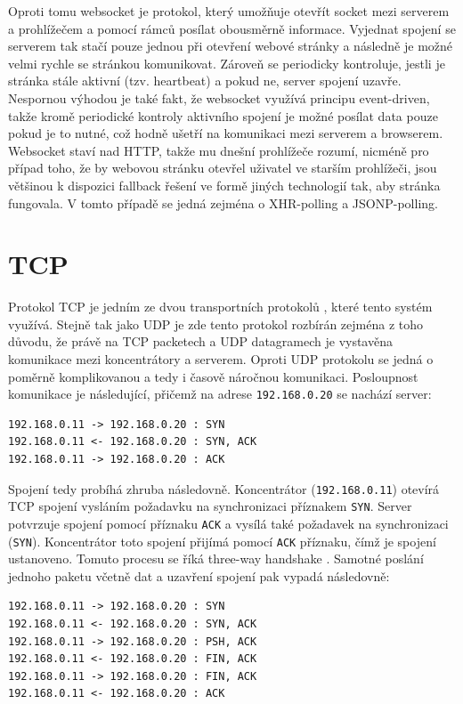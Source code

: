 Oproti tomu websocket \cite{rfc6455} je protokol, který umožňuje otevřít socket mezi serverem a prohlížečem a pomocí rámců posílat obousměrně informace. Vyjednat spojení se serverem tak stačí pouze jednou při otevření webové stránky a následně je možné velmi rychle se stránkou komunikovat. Zároveň se periodicky kontroluje, jestli je stránka stále aktivní (tzv. heartbeat) a pokud ne, server spojení uzavře. Nespornou výhodou je také fakt, že websocket využívá principu event-driven, takže kromě periodické kontroly aktivního spojení je možné posílat data pouze pokud je to nutné, což hodně ušetří na komunikaci mezi serverem a browserem. Websocket staví nad HTTP, takže mu dnešní prohlížeče rozumí, nicméně pro případ toho, že by webovou stránku otevřel uživatel ve starším prohlížeči, jsou většinou k dispozici fallback řešení ve formě jiných technologií tak, aby stránka fungovala. V tomto případě se jedná zejména o XHR-polling a JSONP-polling.

\section{TCP}
Protokol TCP je jedním ze dvou transportních protokolů \cite{mistrovstvi}, které tento systém využívá. Stejně tak jako UDP je zde tento protokol rozbírán zejména z toho důvodu, že právě na TCP packetech a UDP datagramech je vystavěna komunikace mezi koncentrátory a serverem. Oproti UDP protokolu se jedná o poměrně komplikovanou a tedy i časově náročnou komunikaci. Posloupnost komunikace je následující, přičemž na adrese \texttt{192.168.0.20} se  nachází server:

\begin{verbatim}
192.168.0.11 -> 192.168.0.20 : SYN
192.168.0.11 <- 192.168.0.20 : SYN, ACK
192.168.0.11 -> 192.168.0.20 : ACK
\end{verbatim}

Spojení tedy probíhá zhruba následovně. Koncentrátor (\texttt{192.168.0.11}) otevírá TCP spojení vysláním požadavku na synchronizaci příznakem \texttt{SYN}. Server potvrzuje spojení pomocí příznaku \texttt{ACK} a vysílá také požadavek na synchronizaci (\texttt{SYN}). Koncentrátor toto spojení přijímá pomocí \texttt{ACK} příznaku, čímž je spojení ustanoveno. Tomuto procesu se říká three-way handshake \cite{mistrovstvi}. Samotné poslání jednoho paketu včetně dat a uzavření spojení pak vypadá následovně:

\begin{verbatim}
192.168.0.11 -> 192.168.0.20 : SYN
192.168.0.11 <- 192.168.0.20 : SYN, ACK
192.168.0.11 -> 192.168.0.20 : PSH, ACK
192.168.0.11 <- 192.168.0.20 : FIN, ACK
192.168.0.11 -> 192.168.0.20 : FIN, ACK
192.168.0.11 <- 192.168.0.20 : ACK
\end{verbatim}

